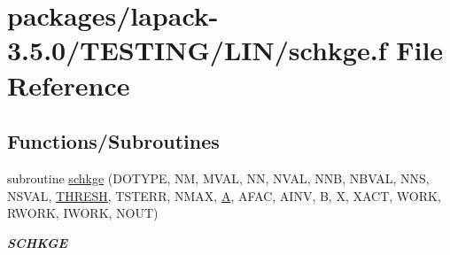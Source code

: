 \hypertarget{schkge_8f}{}\section{packages/lapack-\/3.5.0/\+T\+E\+S\+T\+I\+N\+G/\+L\+I\+N/schkge.f File Reference}
\label{schkge_8f}
\subsection*{Functions/\+Subroutines}
\begin{DoxyCompactItemize}
\item 
subroutine \hyperlink{group__single__lin_gac14b41fbcd75e726223589404833f2c1}{schkge} (D\+O\+T\+Y\+P\+E, N\+M, M\+V\+A\+L, N\+N, N\+V\+A\+L, N\+N\+B, N\+B\+V\+A\+L, N\+N\+S, N\+S\+V\+A\+L, \hyperlink{zlaqgs_8c_a0656018abfc9fa2821827415f5d5ea57}{T\+H\+R\+E\+S\+H}, T\+S\+T\+E\+R\+R, N\+M\+A\+X, \hyperlink{classA}{A}, A\+F\+A\+C, A\+I\+N\+V, B, X, X\+A\+C\+T, W\+O\+R\+K, R\+W\+O\+R\+K, I\+W\+O\+R\+K, N\+O\+U\+T)
\begin{DoxyCompactList}\small\item\em {\bfseries S\+C\+H\+K\+G\+E} \end{DoxyCompactList}\end{DoxyCompactItemize}
